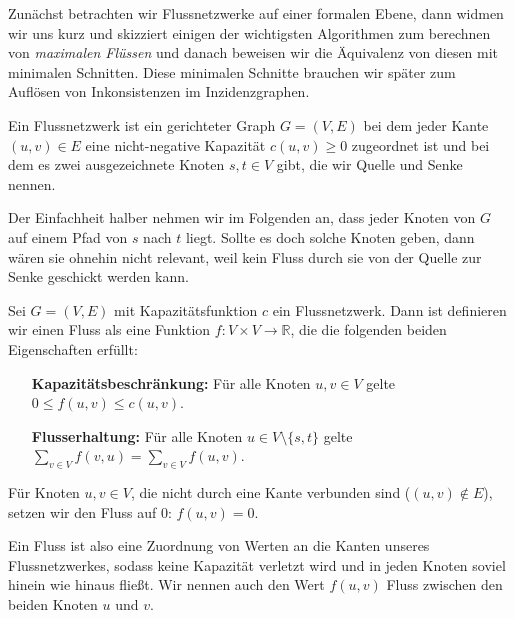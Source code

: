 Zunächst betrachten wir Flussnetzwerke auf einer formalen Ebene, dann widmen wir uns kurz und skizziert einigen der wichtigsten Algorithmen zum berechnen von \emph{maximalen Flüssen} und danach beweisen wir die Äquivalenz von diesen mit minimalen Schnitten. Diese minimalen Schnitte brauchen wir später zum Auflösen von Inkonsistenzen im Inzidenzgraphen.

\begin{definition}[Flussnetzwerk]
	Ein Flussnetzwerk ist ein gerichteter Graph $G = (V,E)$ bei dem jeder Kante $(u,v) \in E$ eine nicht-negative Kapazität $c(u,v) \geq 0$ zugeordnet ist und bei dem es zwei ausgezeichnete Knoten $s, t \in V$ gibt, die wir Quelle und Senke nennen.  
\end{definition}

Der Einfachheit halber nehmen wir im Folgenden an, dass jeder Knoten von $G$ auf einem Pfad von $s$ nach $t$ liegt. Sollte es doch solche Knoten geben, dann wären sie ohnehin nicht relevant, weil kein Fluss durch sie von der Quelle zur Senke geschickt werden kann.

\begin{definition}[Fluss]
	Sei $G = (V,E)$ mit Kapazitätsfunktion $c$ ein Flussnetzwerk. Dann ist definieren wir einen Fluss als eine Funktion $f: V \times V \rightarrow \mathbb{R}$, die die folgenden beiden Eigenschaften erfüllt:
	\begin{itemize}[leftmargin=12em]
		\item[\textbf{Kapazitätsbeschränkung:}] Für alle Knoten $u,v \in V$ gelte $0 \leq f(u,v) \leq c(u,v)$.
		\item[\textbf{Flusserhaltung:}] Für alle Knoten $u \in V\setminus\{s,t\}$ gelte \\ 
			$\sum_{v \in V}{f(v,u)} = \sum_{v \in V}{f(u,v)}$.
	\end{itemize} 
	Für Knoten $u,v\in V$, die nicht durch eine Kante verbunden sind ($(u,v)\notin E$), setzen wir den Fluss auf 0: $f(u,v) = 0$.
\end{definition}

Ein Fluss ist also eine Zuordnung von Werten an die Kanten unseres Flussnetzwerkes, sodass keine Kapazität verletzt wird und in jeden Knoten soviel hinein wie hinaus fließt. Wir nennen auch den Wert $f(u,v)$ Fluss zwischen den beiden Knoten $u$ und $v$.


